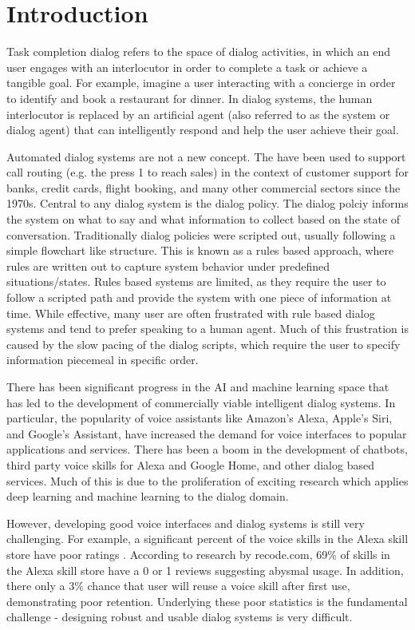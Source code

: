 \chapter{Introduction}

Task completion dialog refers to the space of dialog activities, in which an end user engages with an interlocutor in order to complete a task or achieve a tangible goal. For example, imagine a user interacting with a concierge in order to identify and book a restaurant for dinner. In dialog systems, the human interlocutor is replaced by an artificial agent (also referred to as the system or dialog agent) that can intelligently respond and help the user achieve their goal.

Automated dialog systems are not a new concept. The have been used to support call routing (e.g. the press 1 to reach sales) in the context of customer support for banks, credit cards, flight booking, and many other commercial sectors since the 1970s. Central to any dialog system is the dialog policy. The dialog polciy informs the system on what to say and what information to collect based on the state of conversation. Traditionally dialog policies were scripted out, usually following a simple flowchart like structure. This is known as a rules based approach, where rules are written out to capture system behavior under predefined situations/states. Rules based systems are limited, as they require the user to follow a scripted path and provide the system with one piece of information at time. While effective, many user are often frustrated with rule based dialog systems and tend to prefer speaking to a human agent. Much of this frustration is caused by the slow pacing of the dialog scripts, which require the user to specify information piecemeal in specific order. 

There has been significant progress in the AI and machine learning space that has led to the development of commercially viable intelligent dialog systems. In particular, the popularity of voice assistants like Amazon’s Alexa, Apple’s Siri, and Google's Assistant, have increased the demand for voice interfaces to popular applications and services. There has been a boom in the development of chatbots, third party voice skills for Alexa and Google Home, and other dialog based services. Much of this is due to the proliferation of exciting research which applies deep learning and machine learning to the dialog domain. 

However, developing good voice interfaces and dialog systems is still very challenging. For example, a significant percent of the voice skills in the Alexa skill store have poor ratings \cite{rey_2017}. According to research by recode.com, 69\% of skills in the Alexa skill store have a 0 or 1 reviews suggesting abysmal usage. In addition, there only a 3\% chance that user will reuse a voice skill after first use, demonstrating poor retention. Underlying these poor statistics is the fundamental challenge - designing robust and usable dialog systems is very difficult. 
 
